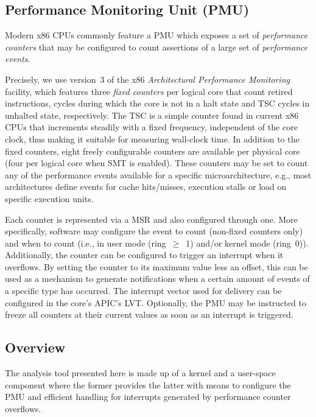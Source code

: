 \subsection{Performance Monitoring Unit (PMU)}
\label{sec:analysis:design:pmu}
Modern \gls{x86} \glspl{CPU} commonly feature a \gls{PMU} \cite{intelsdmsysprogguide} which exposes a set of \textit{performance counters} that may be configured to count assertions of a large set of \textit{performance events}.

Precisely, we use version~3 of the \gls{x86} \textit{Architectural Performance Monitoring} facility, which features three \textit{fixed counters} per logical core that count retired instructions, cycles during which the core is not in a halt state and \gls{TSC} cycles in unhalted state, respectively. The \gls{TSC} is a simple counter found in current \gls{x86} \glspl{CPU} that increments steadily with a fixed frequency, independent of the core clock, thus making it suitable for measuring wall-clock time. In addition to the fixed counters, eight freely configurable counters are available per physical core (four per logical core when \gls{SMT} is enabled). These counters may be set to count any of the performance events available for a specific microarchitecture, e.g., most architectures define events for cache hits/misses, execution stalls or load on specific execution units.

Each counter is represented via a \gls{MSR} and also configured through one. More specifically, software may configure the event to count (non-fixed counters only) and when to count (i.e., in user mode (ring~$\geq$~1) and/or kernel mode (ring~0)). Additionally, the counter can be configured to trigger an interrupt when it overflows. By setting the counter to its maximum value less an offset, this can be used as a mechanism to generate notifications when a certain amount of events of a specific type has occurred. The interrupt vector used for delivery can be configured in the core's \gls{APIC}'s \gls{LVT}. Optionally, the \gls{PMU} may be instructed to freeze all counters at their current values as soon as an interrupt is triggered.

\subsection{Overview}
\label{sec:analysis:design:overview}

The analysis tool presented here is made up of a kernel and a user-space component where the former provides the latter with means to configure the \gls{PMU} and efficient handling for interrupts generated by performance counter overflows.

